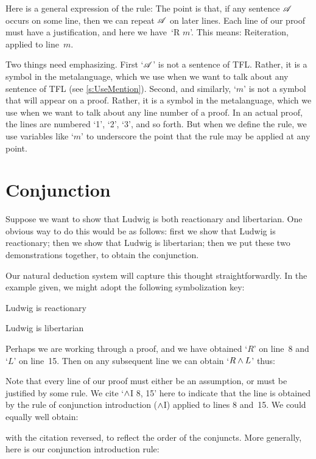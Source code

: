 Here is a general expression of the rule:
The point is that, if any sentence $\mathscr{A}$ occurs on some line,
then we can repeat $\mathscr{A}$ on later lines. Each line of our proof
must have a justification, and here we have~`R $m$'. This means:
Reiteration, applied to line~$m$.

Two things need emphasizing. First `$\mathscr{A}$' is not a sentence of
TFL. Rather, it is a symbol in the metalanguage, which we use when we
want to talk about any sentence of TFL (see \cref{s:UseMention}).
Second, and similarly, `$m$' is not a symbol that will appear on a
proof. Rather, it is a symbol in the metalanguage, which we use when
we want to talk about any line number of a proof. In an actual proof,
the lines are numbered `1', `2', `3', and so forth. But when we
define the rule, we use variables like `$m$' to underscore the point
that the rule may be applied at any point.

\section{Conjunction}
Suppose we want to show that Ludwig is both reactionary and libertarian. One obvious way to do this would be as follows: first we show that Ludwig is reactionary; then we show that Ludwig is libertarian; then we put these two demonstrations together, to obtain the conjunction.

Our natural deduction system will capture this thought straightforwardly. In the example given, we might adopt the following symbolization key:
	\begin{ekey}
		\item[R] Ludwig is reactionary
		\item[L] Ludwig is libertarian
	\end{ekey}
Perhaps we are working through a proof, and we have obtained `$R$' on
line~8 and `$L$' on line~15. Then on any subsequent line we can
obtain `$R \wedge L$' thus:
\begin{fitchproof}
	 
\end{fitchproof}
Note that every line of our proof must either be an assumption, or
must be justified by some rule. We cite `$\wedge$I 8, 15' here to
indicate that the line is obtained by the rule of conjunction
introduction ($\wedge$I) applied to lines 8 and~15. We could
equally well obtain:
\begin{fitchproof}
	 
\end{fitchproof}
with the citation reversed, to reflect the order of the conjuncts. More generally, here is our conjunction introduction rule:


